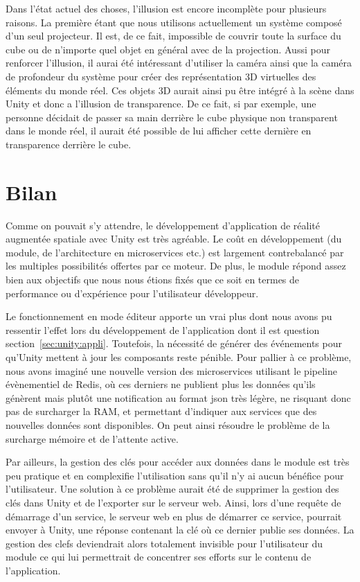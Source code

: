 Dans l'état actuel des choses, l'illusion est encore incomplète pour plusieurs raisons. La première étant que nous utilisons actuellement un système composé d'un seul projecteur. Il est, de ce fait, impossible de couvrir toute la surface du cube ou de n'importe quel objet en général avec de la projection. Aussi pour renforcer l'illusion, il aurai été intéressant d'utiliser la caméra ainsi que la caméra de profondeur du système pour créer des représentation 3D virtuelles des éléments du monde réel. Ces objets 3D aurait ainsi pu être intégré à la scène dans Unity et donc a l'illusion de transparence. De ce fait, si par exemple, une personne décidait de passer sa main derrière le cube physique non transparent dans le monde réel, il aurait été possible de lui afficher cette dernière en transparence derrière le cube.

\section{Bilan}
Comme on pouvait s'y attendre, le développement d'application de réalité augmentée spatiale avec Unity est très agréable. Le coût en développement (du module, de l'architecture en microservices etc.) est largement contrebalancé par les multiples possibilités offertes par ce moteur. De plus, le module répond assez bien aux objectifs que nous nous étions fixés que ce soit en termes de performance ou d'expérience pour l'utilisateur développeur.

Le fonctionnement en mode éditeur apporte un vrai plus dont nous avons pu ressentir l'effet lors du développement de l'application dont il est question section~\ref{sec:unity:appli}. Toutefois, la nécessité de générer des événements pour qu'Unity mettent à jour les composants reste pénible. Pour pallier à ce problème, nous avons imaginé une nouvelle version des microservices utilisant le pipeline évènementiel de Redis, où ces derniers ne publient plus les données qu'ils génèrent mais plutôt une notification au format json très légère, ne risquant donc pas de surcharger la RAM, et permettant d'indiquer aux services que des nouvelles données sont disponibles. On peut ainsi résoudre le problème de la surcharge mémoire et de l'attente active.

Par ailleurs, la gestion des clés pour accéder aux données dans le module est très peu pratique et en complexifie l'utilisation sans qu'il n'y ai aucun bénéfice pour l'utilisateur. Une solution à ce problème aurait été de supprimer la gestion des clés dans Unity et de l'exporter sur le serveur web. Ainsi, lors d'une requête de démarrage d'un service, le serveur web en plus de démarrer ce service, pourrait envoyer à Unity, une réponse contenant la clé où ce dernier publie ses données. La gestion des clefs deviendrait alors totalement invisible pour l'utilisateur du module ce qui lui permettrait de concentrer ses efforts sur le contenu de l'application.